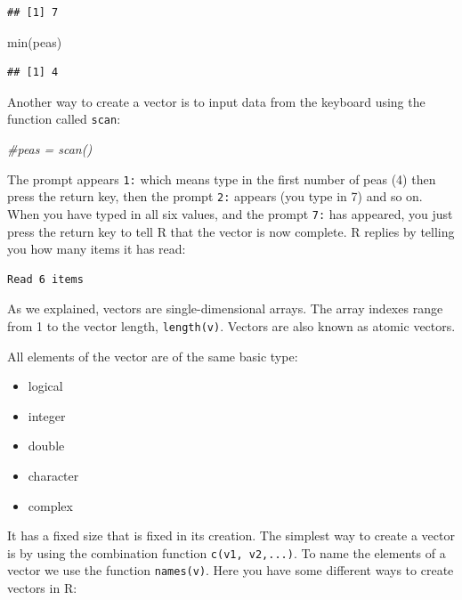 \documentclass[
]{book}
\newenvironment{Shaded}{\begin{snugshade}}{\end{snugshade}}
\newcommand{\CommentTok}[1]{\textcolor[rgb]{0.56,0.35,0.01}{\textit{#1}}}
\newcommand{\FunctionTok}[1]{\textcolor[rgb]{0.00,0.00,0.00}{#1}}
\newcommand{\NormalTok}[1]{#1}
\providecommand{\tightlist}{%
  \setlength{\itemsep}{0pt}\setlength{\parskip}{0pt}}
\theoremstyle{definition}
\theoremstyle{definition}
\theoremstyle{definition}
\theoremstyle{definition}
\theoremstyle{remark}
\begin{document}
\begin{verbatim}
## [1] 7
\end{verbatim}

\begin{Shaded}
\begin{Highlighting}[]
\FunctionTok{min}\NormalTok{(peas)}
\end{Highlighting}
\end{Shaded}

\begin{verbatim}
## [1] 4
\end{verbatim}

Another way to create a vector is to input data from the keyboard using the function called \texttt{scan}:

\begin{Shaded}
\begin{Highlighting}[]
\CommentTok{\#peas = scan()}
\end{Highlighting}
\end{Shaded}

The prompt appears \texttt{1:} which means type in the first number of peas (4) then press the return key, then the prompt \texttt{2:} appears (you type in 7) and so on. When you have typed in all six values, and the prompt \texttt{7:} has appeared, you just press the return key to tell R that the vector is now complete. R replies by telling you how many items it has read:

\begin{verbatim}
Read 6 items
\end{verbatim}

As we explained, vectors are single-dimensional arrays. The array indexes range from 1 to the vector length, \texttt{length(v)}. Vectors are also known as atomic vectors.

All elements of the vector are of the same basic type:

\begin{itemize}
\tightlist
\item
  logical
\item
  integer
\item
  double
\item
  character
\item
  complex
\end{itemize}

It has a fixed size that is fixed in its creation. The simplest way to create a vector is by using the combination function \texttt{c(v1,\ v2,...)}. To name the elements of a vector we use the function \texttt{names(v)}. Here you have some different ways to create vectors in R:
\end{document}
